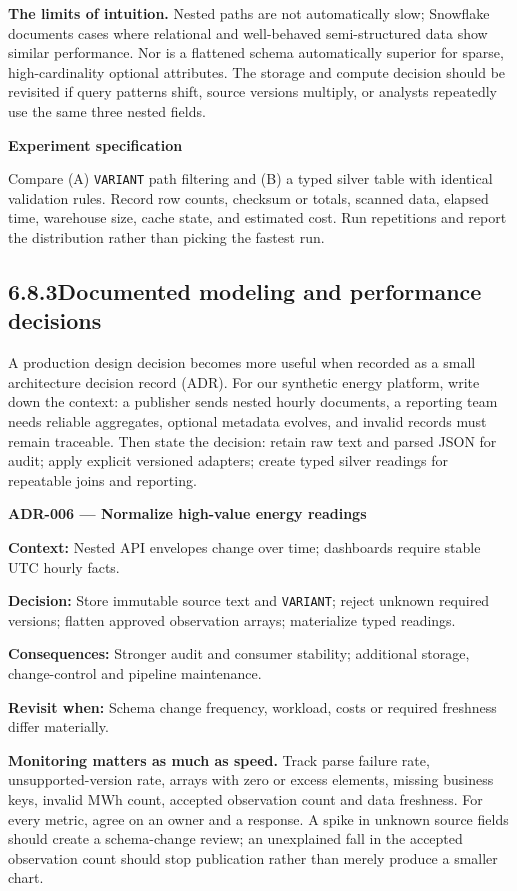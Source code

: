 \documentclass[11pt,twoside]{article}
\newcommand{\topic}[2]{\subsection*{#1\quad #2}}
\begin{document}
\textbf{The limits of intuition.} Nested paths are not automatically slow; Snowflake documents cases where relational and well-behaved semi-structured data show similar performance. Nor is a flattened schema automatically superior for sparse, high-cardinality optional attributes. The storage and compute decision should be revisited if query patterns shift, source versions multiply, or analysts repeatedly use the same three nested fields.

\begin{whitebox}\textbf{Experiment specification}\par
Compare (A) \texttt{VARIANT} path filtering and (B) a typed silver table with identical validation rules. Record row counts, checksum or totals, scanned data, elapsed time, warehouse size, cache state, and estimated cost. Run repetitions and report the distribution rather than picking the fastest run.\end{whitebox}
\newpage
\topic{6.8.3}{Documented modeling and performance decisions}
A production design decision becomes more useful when recorded as a small architecture decision record (ADR). For our synthetic energy platform, write down the context: a publisher sends nested hourly documents, a reporting team needs reliable aggregates, optional metadata evolves, and invalid records must remain traceable. Then state the decision: retain raw text and parsed JSON for audit; apply explicit versioned adapters; create typed silver readings for repeatable joins and reporting.

\begin{whitebox}\textbf{ADR-006 --- Normalize high-value energy readings}\par
\textbf{Context:} Nested API envelopes change over time; dashboards require stable UTC hourly facts.\par
\textbf{Decision:} Store immutable source text and \texttt{VARIANT}; reject unknown required versions; flatten approved observation arrays; materialize typed readings.\par
\textbf{Consequences:} Stronger audit and consumer stability; additional storage, change-control and pipeline maintenance.\par
\textbf{Revisit when:} Schema change frequency, workload, costs or required freshness differ materially.\end{whitebox}

\textbf{Monitoring matters as much as speed.} Track parse failure rate, unsupported-version rate, arrays with zero or excess elements, missing business keys, invalid MWh count, accepted observation count and data freshness. For every metric, agree on an owner and a response. A spike in unknown source fields should create a schema-change review; an unexplained fall in the accepted observation count should stop publication rather than merely produce a smaller chart.
\end{document}
